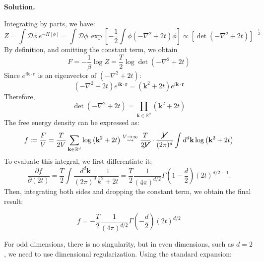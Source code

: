 \documentclass[11pt,a4paper]{article}
\newcounter{problem}
\newcounter{saveequation}
\newenvironment{solution}
{
	\par
	\setcounter{saveequation}{\value{equation}}
	\begingroup
	\setcounter{equation}{0}
	\renewcommand{\theequation}{\arabic{problem}.\arabic{equation}}
	\renewcommand{\theHequation}{sol.\arabic{problem}.\arabic{equation}}
	\noindent\textbf{Solution.}\quad
}
{
	\par
	\endgroup
	\setcounter{equation}{\value{saveequation}}
}
\begin{document}
	\begin{solution}
		Integrating by parts, we have:
		\begin{equation}
			\label{eq:5.1}
			Z = \int \mathcal{D}\phi\, e^{-H[\phi]}=\int \mathcal{D}\phi\, \exp\left[-\frac12\int \phi\left(-\nabla^2+2t\right)\phi\right]\propto \left[\det \left(-\nabla^2+2t\right)\right]^{-\frac12}
		\end{equation}
		By definition, and omitting the constant term, we obtain
		\begin{equation}
			F=-\frac{1}{\beta}\log Z=\frac{T}{2}\log\det  \left(-\nabla^2+2t\right)
		\end{equation}
		Since $e^{i\mathbf{k}\cdot\mathbf{r}}$ is an eigenvector of $\left(-\nabla^2+2t\right)$:
		\begin{equation}
			\left(-\nabla^2+2t\right)e^{i\mathbf{k}\cdot\mathbf{r}}=\left(\mathbf{k}^2+2t\right)e^{i\mathbf{k}\cdot\mathbf{r}}
		\end{equation}
		Therefore, 
		\begin{equation}
			\det \left(-\nabla^2+2t\right)=\prod_{\mathbf{k}\in\mathbb{R}^d}\left(\mathbf{k}^2+2t\right)
		\end{equation}
		The free energy density can be expressed as:
		\begin{equation}
			f:=\frac FV= \frac{T}{2V}\sum_{\mathbf{k}\in\mathbb{R}^d}\log\left(\mathbf{k}^2+2t\right)
			\overset{V\to\infty}{\rightsquigarrow}\frac{T}{2\cancel{V}}\cdot\frac{\cancel{V}}{(2\pi)^d}\int d^d\mathbf{k} \log\left(\mathbf{k}^2+2t\right)
		\end{equation}
		To evaluate this integral, we first differentiate it:
		\begin{equation}
			\frac{\partial f}{\partial(2t)}
			=
			\frac T2\int \frac{d^d\mathbf{k}}{(2\pi)^d}\frac{1}{k^2+2t}
			=
			\frac T2\frac{1}{(4\pi)^{d/2}}
			\Gamma\left(1-\frac d2\right)(2t)^{d/2-1}.
		\end{equation}
		Then, integrating both sides and dropping the constant term, we obtain the final result:
		\begin{finalanswer}
			\begin{equation}
				\label{fin:5}
				f=-\frac{T}{2}\frac{1}{(4\pi)^{d/2}}\Gamma\left(-\frac d2\right)(2t)^{d/2}
			\end{equation}
		\end{finalanswer}
	For odd dimensions, there is no singularity, but in even dimensions, such as $d=2$, we need to use dimensional regularization. Using the standard expansion:
	\begin{equation}

\end{equation}
\end{solution}
\end{document}
